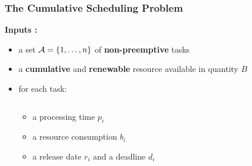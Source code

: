 \begin{frame}
  \frametitle{The Cumulative Scheduling Problem} 
  \vspace{0.1cm}
  \textbf{Inputs : }
  \vspace{0.15cm}
  \begin{itemize}
  \item a set ${\cal A}=\{1,\dots ,n\}$ of {\bf non-preemptive} tasks
    \vspace{0.15cm}
  \item a {\bf cumulative} and {\bf renewable} resource available in quantity $B$
    \vspace{0.15cm}
  \item<2-> for each task:
    \vspace{-1cm}
    \begin{columns}
      \hfill
      \begin{column}{0.36\linewidth}
        \begin{itemize}
        \item<2-> \footnotesize  a processing time $p_i$
        \item<3-> \footnotesize a resource consumption $b_i$ 
        \item<4-> \footnotesize a release date $r_i$ and a deadline $d_i$ 
        \end{itemize}
      \end{column}
      \begin{column}{0.7\linewidth}
        \centering
        
      \end{column} 
    \end{columns}
  \end{itemize}
  \vspace{-0.5cm}
\end{frame}




